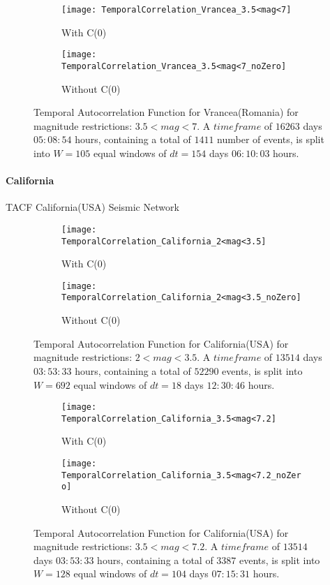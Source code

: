 \begin{figure}[!ht]
\begin{subfigure}{.5\textwidth}
  \centering
  \texttt{[image: TemporalCorrelation\_Vrancea\_3.5<mag<7]}
  \caption{With C(0)}
  \label{fig:corrVrancea3.5_7}
\end{subfigure}%
\begin{subfigure}{.5\textwidth}
  \centering
  \texttt{[image: TemporalCorrelation\_Vrancea\_3.5<mag<7\_noZero]}
  \caption{Without C(0)}
  \label{fig:corrVrancea3.5_7_noZero}
\end{subfigure}
\caption{Temporal Autocorrelation Function for Vrancea(Romania) for magnitude restrictions: $3.5<mag<7$. A $timeframe$ of $16263$ days $05:08:54$ hours, containing a total of $1411$ number of events, is split into $W=105$ equal windows of $dt=154$ days $06:10:03$ hours.}
\label{fig:corrVrancea3.5_7!}
\end{figure}


\clearpage
\paragraph{California} TACF California(USA) Seismic Network

\begin{figure}[!ht]
\begin{subfigure}{.5\textwidth}
  \centering
  \texttt{[image: TemporalCorrelation\_California\_2<mag<3.5]}
  \caption{With C(0)}
  \label{fig:corrCalifornia2_3.5}
\end{subfigure}%
\begin{subfigure}{.5\textwidth}
  \centering
  \texttt{[image: TemporalCorrelation\_California\_2<mag<3.5\_noZero]}
  \caption{Without C(0)}
  \label{fig:corrCalifornia2_3.5_noZero}
\end{subfigure}
\caption{Temporal Autocorrelation Function for California(USA) for magnitude restrictions: $2<mag<3.5$. A $timeframe$ of $13514$ days $03:53:33$ hours, containing a total of $52290$ events, is split into $W=692$ equal windows of $dt=18$ days $12:30:46$ hours.}
\label{fig:corrCalifornia2_3.5!}
\end{figure}

\begin{figure}[!ht]
\begin{subfigure}{.5\textwidth}
  \centering
  \texttt{[image: TemporalCorrelation\_California\_3.5<mag<7.2]}
  \caption{With C(0)}
  \label{fig:corrCalifornia3.5_7}
\end{subfigure}%
\begin{subfigure}{.5\textwidth}
  \centering
  \texttt{[image: TemporalCorrelation\_California\_3.5<mag<7.2\_noZero]}
  \caption{Without C(0)}
  \label{fig:corrCalifornia3.5_7_noZero}
\end{subfigure}
\caption{Temporal Autocorrelation Function for California(USA) for magnitude restrictions: $3.5<mag<7.2$. A $timeframe$ of $13514$ days $03:53:33$ hours, containing a total of $3387$ events, is split into $W=128$ equal windows of $dt=104$ days $07:15:31$ hours.}
\label{fig:corrCalifornia3.5_7!}
\end{figure}


